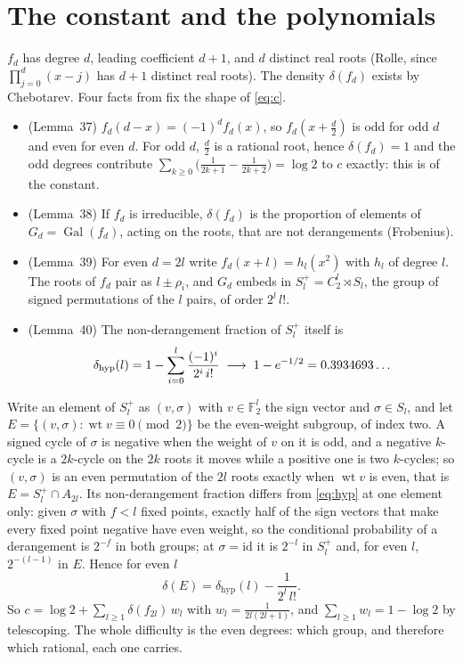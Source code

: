 \documentclass[11pt]{article}
\DeclareMathOperator{\Gal}{Gal}
\DeclareMathOperator{\wt}{wt}
\newcommand{\Sl}{S_l^{+}}
\begin{document}
\section{The constant and the polynomials}\label{sec:setup}

$f_d$ has degree $d$, leading coefficient $d+1$, and $d$ distinct real roots (Rolle, since $\prod_{j=0}^d(x-j)$ has $d+1$ distinct real roots). The density $\delta(f_d)$ exists by Chebotarev. Four facts from \cite{vD24} fix the shape of \eqref{eq:c}.

\begin{itemize}
\item (Lemma~37) $f_d(d-x)=(-1)^df_d(x)$, so $f_d(x+\frac d2)$ is odd for odd $d$ and even for even $d$. For odd $d$, $\frac d2$ is a rational root, hence $\delta(f_d)=1$ and the odd degrees contribute $\sum_{k\ge0}\bigl(\frac1{2k+1}-\frac1{2k+2}\bigr)=\log2$ to $c$ exactly: this is \LogTwoShare{} of the constant.
\item (Lemma~38) If $f_d$ is irreducible, $\delta(f_d)$ is the proportion of elements of $G_d=\Gal(f_d)$, acting on the roots, that are not derangements (Frobenius).
\item (Lemma~39) For even $d=2l$ write $f_d(x+l)=h_l(x^2)$ with $h_l$ of degree $l$. The roots of $f_d$ pair as $l\pm\rho_i$, and $G_d$ embeds in $\Sl=C_2^l\rtimes S_l$, the group of signed permutations of the $l$ pairs, of order $2^l\,l!$.
\item (Lemma~40) The non-derangement fraction of $\Sl$ itself is
\begin{equation}\label{eq:hyp}
\delta_{\mathrm{hyp}}(l)=1-\sum_{i=0}^{l}\frac{(-1)^i}{2^i\,i!}\;\longrightarrow\;1-e^{-1/2}=0.3934693\ldots
\end{equation}
\end{itemize}
Write an element of $\Sl$ as $(v,\sigma)$ with $v\in\mathbb F_2^l$ the sign vector and $\sigma\in S_l$, and let $E=\{(v,\sigma):\wt v\equiv0\pmod2\}$ be the even-weight subgroup, of index two. A signed cycle of $\sigma$ is negative when the weight of $v$ on it is odd, and a negative $k$-cycle is a $2k$-cycle on the $2k$ roots it moves while a positive one is two $k$-cycles; so $(v,\sigma)$ is an even permutation of the $2l$ roots exactly when $\wt v$ is even, that is $E=\Sl\cap A_{2l}$. Its non-derangement fraction differs from \eqref{eq:hyp} at one element only: given $\sigma$ with $f<l$ fixed points, exactly half of the sign vectors that make every fixed point negative have even weight, so the conditional probability of a derangement is $2^{-f}$ in both groups; at $\sigma=\mathrm{id}$ it is $2^{-l}$ in $\Sl$ and, for even $l$, $2^{-(l-1)}$ in $E$. Hence for even $l$
\begin{equation}\label{eq:index2}
\delta(E)=\delta_{\mathrm{hyp}}(l)-\frac1{2^l\,l!}.
\end{equation}
So $c=\log2+\sum_{l\ge1}\delta(f_{2l})\,w_l$ with $w_l=\frac1{2l(2l+1)}$, and $\sum_{l\ge1}w_l=1-\log2$ by telescoping. The whole difficulty is the even degrees: which group, and therefore which rational, each one carries.
\end{document}
